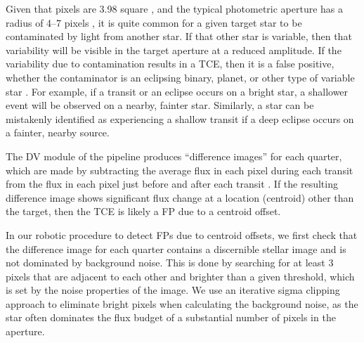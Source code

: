 Given that \keplers{} pixels are 3.98\arcsec{} square \citep{Koch2010}, and the typical photometric aperture has a radius of 4--7 pixels \citep{Bryson2010b}, it is quite common for a given target star to be contaminated by light from another star. If that other star is variable, then that variability will be visible in the target aperture at a reduced amplitude. If the variability due to contamination results in a TCE, then it is a false positive, whether the contaminator is an eclipsing binary, planet, or other type of variable star \citep{Bryson2013}. For example, if a transit or an eclipse occurs on a bright star, a shallower event will be observed on a nearby, fainter star. Similarly, a star can be mistakenly identified as experiencing a shallow transit if a deep eclipse occurs on a fainter, nearby source.



The DV module of the \kepler{} pipeline produces ``difference images'' for each quarter, which are made by subtracting the average flux in each pixel during each transit from the flux in each pixel just before and after each transit \citep{Bryson2013}. If the resulting difference image shows significant flux change at a location (centroid) other than the target, then the TCE is likely a FP due to a centroid offset.



In our robotic procedure to detect FPs due to centroid offsets, we first check that the difference image for each quarter contains a discernible stellar image and is not dominated by background noise. This is done by searching for at least 3 pixels that are adjacent to each other and brighter than a given threshold, which is set by the noise properties of the image. We use an iterative sigma clipping approach to eliminate bright pixels when calculating the background noise, as the star often dominates the flux budget of a substantial number of pixels in the aperture.

